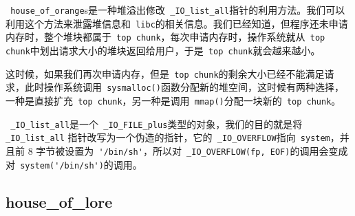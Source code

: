 \verb+ house_of_orange+s是一种堆溢出修改\verb+ _IO_list_all+指针的利用方法。我们可以利用这个方法来泄露堆信息和\verb+ libc+的相关信息。我们已经知道，但程序还未申请内存时，整个堆块都属于\verb+ top chunk+，每次申请内存时，操作系统就从\verb+ top chunk+中划出请求大小的堆块返回给用户，于是\verb+ top chunk+就会越来越小。

这时候，如果我们再次申请内存，但是\verb+ top chunk+的剩余大小已经不能满足请求，此时操作系统调用\verb+ sysmalloc()+函数分配新的堆空间，这时候有两种选择，一种是直接扩充\verb+ top chunk+，另一种是调用\verb+ mmap()+分配一块新的\verb+ top chunk+。

\verb+ _IO_list_all+是一个\verb+ _IO_FILE_plus+类型的对象，我们的目的就是将\verb+ _IO_list_all+ 指针改写为一个伪造的指针，它的\verb+ _IO_OVERFLOW+指向\verb+ system+，并且前 8 字节被设置为\verb+ '/bin/sh'+，所以对\verb+ _IO_OVERFLOW(fp, EOF)+的调用会变成对\verb+ system('/bin/sh')+的调用。

\subsection{house\_of\_lore}

